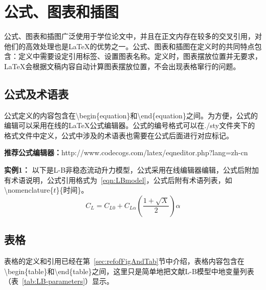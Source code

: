 
\chapter{公式、图表和插图}
\label{chap:eqnFigAndTab}
公式、图表和插图广泛使用于学位论文中，并且在正文内存在较多的交叉引用，对他们的高效处理也是\LaTeX{}的优势之一。公式、图表和插图在定义时的共同特点包含：定义中需要设定引用标签、设置图表名称。定义时，图表摆放位置并无要求，\LaTeX{}会根据文稿内容自动计算图表摆放位置，不会出现表格窜行的问题。

\section{公式及术语表}
\label{sec:eqn}

公式定义的内容包含在\textbackslash begin\{equation\}和\textbackslash end\{equation\}之间。为方便，公式的编辑可以采用在线的\LaTeX{}公式编辑器。公式的编号格式可以在./sty文件夹下的格式文件中定义，公式中涉及的术语表也需要在公式后面进行对应标记。

{\bf{推荐公式编辑器：}}http://www.codecogs.com/latex/eqneditor.php?lang=zh-cn

{\bf{实例1：}} 以下是L-B非稳态流动升力模型，公式采用在线编辑器编辑，公式后附加有术语说明，公式引用格式为~\ref{eqn:LBmodel}，公式后附有术语列表，如\textbackslash nomenclature\{$t$\}\{时间\}。
\begin{equation}
 \label{eqn:LBmodel}
   C_{L}=C_{L0}+C_{L\alpha }\left ( \frac{1+\sqrt{X}}{2} \right )\alpha 
\end{equation}
%
%
%
%
%
%
%
%
%

\section{表格}
\label{sec:tab}
表格的定义和引用已经在第~\ref{sec:refofFigAndTab}节中介绍，表格内容包含在\textbackslash begin\{table\}和\textbackslash end\{table\}之间，这里只是简单地把\cite{Pattinson:2013_postall_oscillation}文献L-B模型中地变量列表（表~\ref{tab:LB-parameters}）显示。

